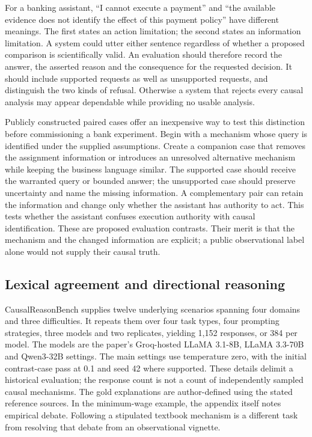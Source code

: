 For a banking assistant, ``I cannot execute a payment'' and ``the available
evidence does not identify the effect of this payment policy'' have different
meanings. The first states an action limitation; the second states an
information limitation. A system could utter either sentence regardless of
whether a proposed comparison is scientifically valid. An evaluation should
therefore record the answer, the asserted reason and the consequence for the
requested decision. It should include supported requests as well as
unsupported requests, and distinguish the two kinds of refusal. Otherwise a
system that rejects every causal analysis may appear dependable while
providing no usable analysis.

Publicly constructed paired cases offer an inexpensive way to test this
distinction before commissioning a bank experiment. Begin with a mechanism
whose query is identified under the supplied assumptions. Create a companion
case that removes the assignment information or introduces an unresolved
alternative mechanism while keeping the business language similar. The
supported case should receive the warranted query or bounded answer; the
unsupported case should preserve uncertainty and name the missing information.
A complementary pair can retain the information and change only whether the
assistant has authority to act. This tests whether the assistant confuses
execution authority with causal identification. These are proposed evaluation
contrasts. Their merit is that the mechanism and the changed information are
explicit; a public observational label alone would not supply their causal
truth.

\subsection{Lexical agreement and directional reasoning}

CausalReasonBench supplies twelve underlying scenarios spanning four domains
and three difficulties. It repeats them over four task types, four prompting
strategies, three models and two replicates, yielding 1,152 responses, or 384
per model. The models are the paper's Groq-hosted LLaMA 3.1-8B, LLaMA 3.3-70B
and Qwen3-32B settings. The main settings use temperature zero, with the initial
contrast-case pass at 0.1 and seed 42 where supported. These details delimit a
historical evaluation; the response count is not a count of independently
sampled causal mechanisms. The gold explanations are author-defined using
the stated reference sources. In the minimum-wage example, the appendix itself
notes empirical debate. Following a stipulated textbook mechanism is a
different task from resolving that debate from an observational
vignette.\citep{exec17_benchmark_cherif}

